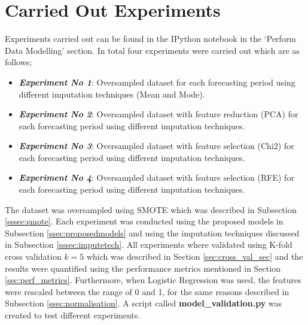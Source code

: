 \section{Carried Out Experiments}\label{sec:carriedexp}
Experiments carried out can be found in the IPython notebook in the ‘Perform Data Modelling’ section. In total four experiments were carried out which are as follows;
\begin{itemize}
\itemsep0em
    \item \textbf{\textit{Experiment No 1}}: Oversampled dataset for each forecasting period using different imputation techniques (Mean and Mode). 
    \item \textbf{\textit{Experiment No 2}}: Oversampled dataset with feature reduction (PCA) for each forecasting period using different imputation techniques. 
    \item \textbf{\textit{Experiment No 3}}: Oversampled dataset with feature selection (Chi2) for each forecasting period using different imputation techniques. 
    \item \textbf{\textit{Experiment No 4}}: Oversampled dataset with feature selection (RFE) for each forecasting period using different imputation techniques. 
\end{itemize}

\noindent The dataset was oversampled using SMOTE which was described in Subsection \ref{sssec:smote}. Each experiment was conducted using the proposed models in Subsection \ref{ssec:proposedmodels} and using the imputation techniques discussed in Subsection \ref{sssec:imputetech}. All experiments where validated using K-fold cross validation \(k = 5\) which was described in Section \ref{sec:cross_val_sec} and the results were quantified using the performance metrics mentioned in Section \ref{sec:perf_metrics}. Furthermore, when Logistic Regression was used, the features were rescaled between the range of 0 and 1, for the same reasons described in Subsection \ref{ssec:normalisation}. A script called \textbf{model\_validation.py} was created to test different experiments.  